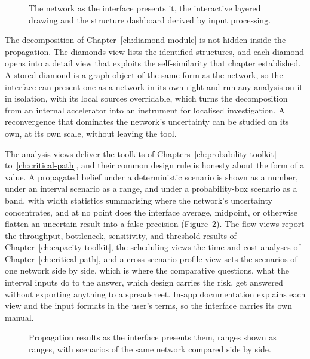 \documentclass[12pt]{report}
\begin{document}
\begin{figure}[htbp]
  \centering
  \caption{The network as the interface presents it, the interactive layered drawing and the structure dashboard derived by input processing.}
  \label{fig:fe-network-view}
\end{figure}

The decomposition of Chapter~\ref{ch:diamond-module} is not hidden inside the propagation. The diamonds view lists the identified structures, and each diamond opens into a detail view that exploits the self-similarity that chapter established. A stored diamond is a graph object of the same form as the network, so the interface can present one as a network in its own right and run any analysis on it in isolation, with its local sources overridable, which turns the decomposition from an internal accelerator into an instrument for localised investigation. A reconvergence that dominates the network's uncertainty can be studied on its own, at its own scale, without leaving the tool.

The analysis views deliver the toolkits of Chapters~\ref{ch:probability-toolkit} to~\ref{ch:critical-path}, and their common design rule is honesty about the form of a value. A propagated belief under a deterministic scenario is shown as a number, under an interval scenario as a range, and under a probability-box scenario as a band, with width statistics summarising where the network's uncertainty concentrates, and at no point does the interface average, midpoint, or otherwise flatten an uncertain result into a false precision (Figure~\ref{fig:fe-results-view}). The flow views report the throughput, bottleneck, sensitivity, and threshold results of Chapter~\ref{ch:capacity-toolkit}, the scheduling views the time and cost analyses of Chapter~\ref{ch:critical-path}, and a cross-scenario profile view sets the scenarios of one network side by side, which is where the comparative questions, what the interval inputs do to the answer, which design carries the risk, get answered without exporting anything to a spreadsheet. In-app documentation explains each view and the input formats in the user's terms, so the interface carries its own manual.

\begin{figure}[htbp]
  \centering
  \caption{Propagation results as the interface presents them, ranges shown as ranges, with scenarios of the same network compared side by side.}
  \label{fig:fe-results-view}
\end{figure}
\end{document}
